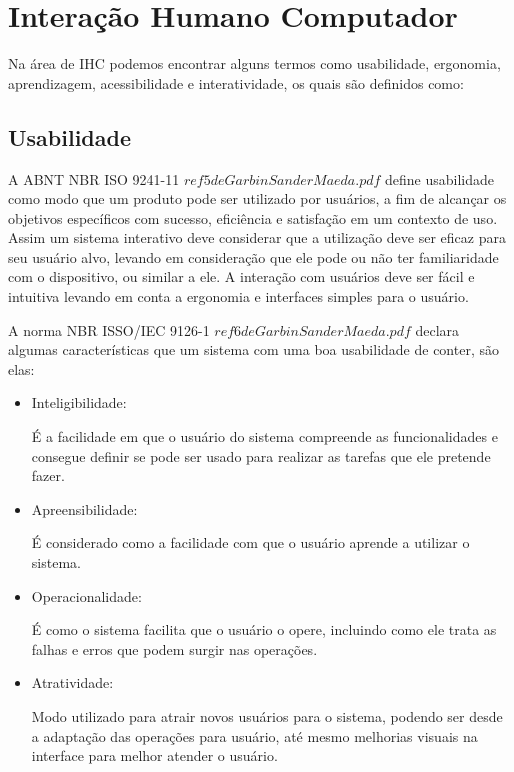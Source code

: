 \documentclass[
	12pt,			%
	openright,		%
	oneside,			%
	a4paper,			%
	chapter=TITLE,		%
	english,			%
	brazil,			%
	]{abntex2}
\begin{document}
\section{Interação Humano Computador}

Na área de IHC podemos encontrar alguns termos como usabilidade, ergonomia, aprendizagem, acessibilidade e interatividade, os quais são definidos como:

\subsection{Usabilidade}

A ABNT NBR ISO 9241-11 \(ref 5 de Garbin Sander Maeda.pdf\) define usabilidade como modo que um produto pode ser utilizado por usuários, a fim de alcançar os objetivos específicos com sucesso, eficiência e satisfação em um contexto de uso. Assim um sistema interativo deve considerar que a utilização deve ser eficaz para seu usuário alvo, levando em consideração que ele pode ou não ter familiaridade com o dispositivo, ou similar a ele. A interação com usuários deve ser fácil e intuitiva levando em conta a ergonomia e interfaces simples para o usuário.

A norma NBR ISSO/IEC 9126-1 \(ref 6 de Garbin Sander Maeda.pdf\) declara algumas características que um sistema com uma boa usabilidade de conter, são elas:

\begin{itemize}
	\item Inteligibilidade:

É a facilidade em que o usuário do sistema compreende as funcionalidades e consegue definir se pode ser usado para realizar as tarefas que ele pretende fazer.

\item Apreensibilidade:

É considerado como a facilidade com que o usuário aprende a utilizar o sistema.

\item Operacionalidade:

É como o sistema facilita que o usuário o opere, incluindo como ele trata as falhas e erros que podem surgir nas operações.

\item Atratividade:

Modo utilizado para atrair novos usuários para o sistema, podendo ser desde a adaptação das operações para usuário, até mesmo melhorias visuais na interface para melhor atender o usuário.

\end{itemize}
\end{document}

